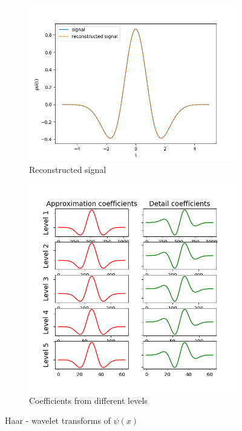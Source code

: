\documentclass[12pt]{article}
\begin{document}
\begin{figure}[h]
	\centering
	\begin{subfigure}[h]{0.40\textwidth}
		\centering
		\includegraphics[width=\textwidth]{wavelet_reconst_haar.png}
		\caption{Reconstructed signal}
	\end{subfigure}
	\begin{subfigure}[h]{0.40\textwidth}
		\centering
		\includegraphics[width=\textwidth]{Wavelet_coeff_Haar.png}
		\caption{Coefficients from different levels}
	\end{subfigure}
	\caption{Haar - wavelet transforms of $\psi(x)$}
\end{figure}\\\\ 
\end{document}
